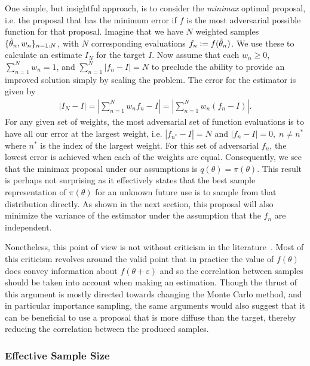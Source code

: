 One simple, but insightful approach, is to consider the 
\emph{minimax} optimal proposal, i.e. the proposal that has the minimum error if $f$ is the
most adversarial possible function for that proposal.
Imagine that we have $N$ weighted samples
$\{\hat{\theta}_n,w_n\}_{n=1:N}$, with $N$ corresponding evaluations $f_n := f(\hat{\theta}_n)$.
We use these to calculate an estimate $I_N$ for the target $I$.
Now assume that each $w_n\ge0$, $\sum_{n=1}^{N}w_n = 1$, and $\sum_{n=1}^{N} |f_n-I| = N$ to
preclude the ability to provide an improved solution simply by scaling the problem.
The error for the estimator is given by
\begin{align}
\left|I_N-I\right| = \left|\sum_{n=1}^{N} w_n f_n - I\right| = \left|\sum_{n=1}^{N} w_n (f_n - I)\right|.
\end{align}
For any given set of weights, the most adversarial set of function evaluations is
to have all our error at the largest weight, i.e. $|f_{n^*}-I| = N$ and $|f_{n}-I| = 0, \; n\neq n^*$
where $n^*$ is the index of the largest weight.  For this set of adversarial $f_n$, the
lowest error is achieved when each of the weights are equal.  Consequently,
we see that the minimax proposal under our assumptions is $q(\theta)=\pi(\theta)$.
This result is perhaps not surprising as it effectively states that the best sample representation 
of $\pi(\theta)$ for an unknown future use is to sample from that distribution directly.
As shown in the next section, this proposal will also minimize the variance of the estimator
under the assumption that the $f_n$ are independent.

Nonetheless, this point of view is not without criticism in the 
literature~\citep{o1987monte,ghahramani2003bayesian,briol2015probabilistic}.  Most of 
this criticism revolves around the valid point that in practice the value of $f(\theta)$ 
does convey information about $f(\theta+\varepsilon)$ and so the correlation between 
samples should be taken into account when making an estimation.  Though the thrust of
this argument is mostly directed towards changing the Monte Carlo method, and in particular
importance sampling, the same arguments would also suggest
that it can be beneficial to use a proposal that is more diffuse than the target, thereby
reducing the correlation between the produced samples.

\subsubsection{Effective Sample Size}
\label{sec:inf:foundation:ess}

